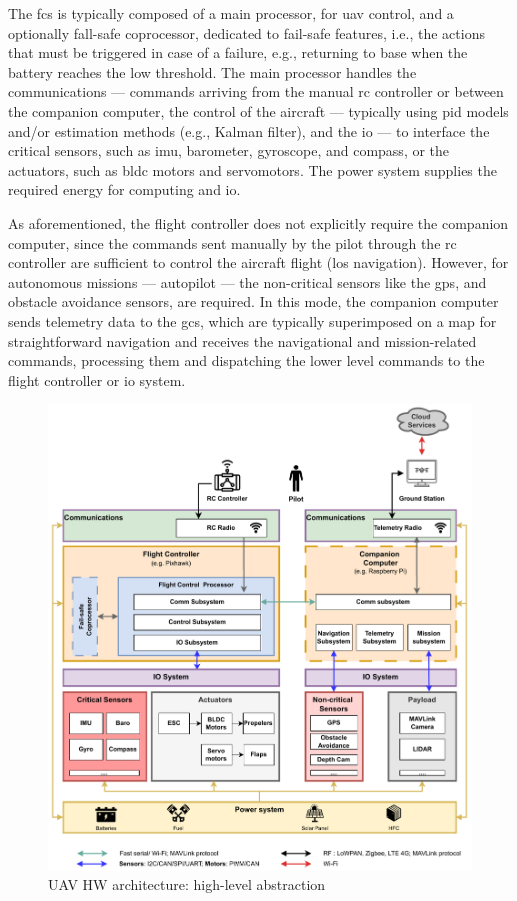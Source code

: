 The \gls{fcs} is typically composed of a main processor, for \gls{uav} control,
and a optionally fall-safe coprocessor, dedicated to fail-safe features, i.e., the actions that
must be triggered in case of a failure, e.g., returning to base when the
battery reaches the low threshold. The main processor handles the communications
--- commands arriving from the manual \gls{rc} controller or between the
companion computer, the control of the aircraft --- typically using \gls{pid}
models and/or estimation methods (e.g., Kalman filter), and the \gls{io} --- to
interface the critical sensors, such as \gls{imu}, barometer, gyroscope, and
compass, or the actuators, such as \gls{bldc} motors and servomotors. The power
system supplies the required energy for computing and \gls{io}.

As aforementioned, the flight controller does not explicitly require the
companion computer, since the commands sent manually by the pilot
through the \gls{rc} controller are sufficient to control the aircraft flight
(\gls{los} navigation). However, for autonomous missions --- autopilot --- the non-critical
sensors like the \gls{gps}, and obstacle avoidance sensors, are required. In
this mode, the companion computer sends telemetry data to the \gls{gcs}, which
are typically superimposed on a map for straightforward navigation and receives
the navigational and mission-related commands, processing them and dispatching
the lower level commands to the flight controller or \gls{io} system.

\begin{figure}[!hbt]
  \centering
  \includegraphics[width=1.0\textwidth]{./img/pdf/uav-hw-arch.pdf} 
  \caption{UAV HW architecture: high-level abstraction}%
  \label{fig:uav-hw-arch}
\end{figure}

